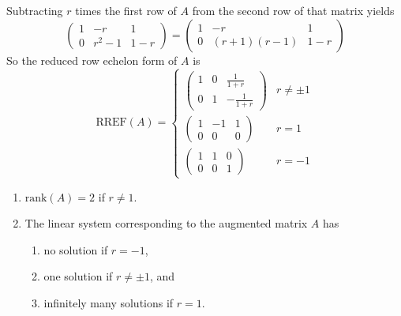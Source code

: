 \documentclass{ximera}
\begin{document}
\begin{exercise}
\begin{solution}
	Subtracting $r$ times the first row of $A$ from the second row of that matrix yields
	\[
		\left(\begin{array}{cc|c}  
			 1 & -r & 1\\  
 			0 & r^2-1 & 1-r 
	\end{array}\right)=\left(\begin{array}{cc|c}  
 			1 & -r & 1\\  
			 0 & (r+1)(r-1) & 1-r 
			\end{array}\right)
	\]
So the reduced row echelon form of $A$ is
	\[
		\text{RREF}(A)=
			\begin{cases}
			\left(\begin{array}{cc|c}  
 				1 & 0 & \frac{1}{1+r}\\  
 				0 & 1 & -\frac{1}{1+r}
			\end{array}\right) & r\neq \pm 1\\
			\left(\begin{array}{cc|c}  
 				1 & -1 & 1\\  
 				0 & 0 & 0 
			\end{array}\right) & r=1\\
			\left(\begin{array}{cc|c}  
 				1 & 1 & 0\\  
 				0 & 0 & 1 
			\end{array}\right) & r=-1
			\end{cases}
	\]
	\begin{enumerate}
		\item $\text{rank}(A)=2$ if $r\neq 1$.
		\item The linear system corresponding to the augmented matrix $A$ has 
			\begin{enumerate}
			\item no solution if $r=-1$, 
			\item one solution if $r\neq \pm 1$, and  
			\item infinitely many solutions if $r=1$.
			\end{enumerate}
	\end{enumerate}
\end{solution}

\end{exercise}
\end{document}
